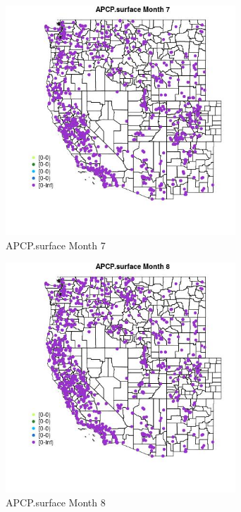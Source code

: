 \begin{figure} 
\centering  
\includegraphics[width=0.77\textwidth]{Code_Outputs/Report_ML_input_PM25_Step4_part_f_de_duplicated_aveswNAs_MapObsMo7APCPsurface.jpg} 
\caption{\label{fig:Report_ML_input_PM25_Step4_part_f_de_duplicated_aveswNAsMapObsMo7APCPsurface}APCP.surface Month 7} 
\end{figure} 
 

\begin{figure} 
\centering  
\includegraphics[width=0.77\textwidth]{Code_Outputs/Report_ML_input_PM25_Step4_part_f_de_duplicated_aveswNAs_MapObsMo8APCPsurface.jpg} 
\caption{\label{fig:Report_ML_input_PM25_Step4_part_f_de_duplicated_aveswNAsMapObsMo8APCPsurface}APCP.surface Month 8} 
\end{figure} 
 

